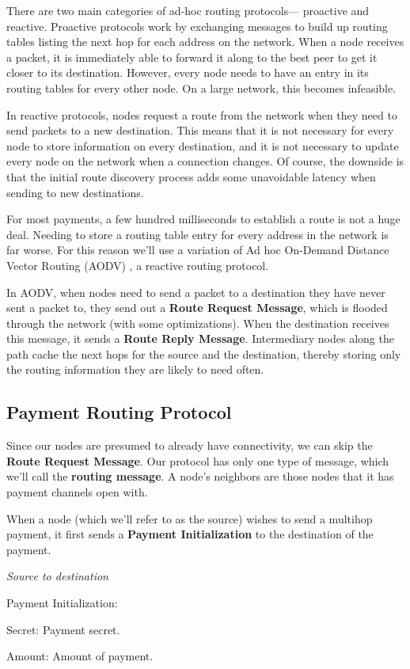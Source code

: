 \documentclass[a4paper]{article}
\newcommand{\bgls}[1]{\textbf{\gls{#1}}}
\newenvironment{mydescription}
{\begin{description}
  \setlength{\itemsep}{5pt}
    \setlength{\parskip}{0pt}
    \setlength{\labelsep}{5pt}
}{
\end{description}}
\begin{document}
There are two main categories of ad-hoc routing protocols--- proactive and reactive. Proactive protocols work by exchanging messages to build up routing tables listing the next hop for each address on the network. When a node receives a packet, it is immediately able to forward it along to the best peer to get it closer to its destination. However, every node needs to have an entry in its routing tables for every other node. On a large network, this becomes infeasible.

In reactive protocols, nodes request a route from the network when they need to send packets to a new destination. This means that it is not necessary for every node to store information on every destination, and it is not necessary to update every node on the network when a connection changes. Of course, the downside is that the initial route discovery process adds some unavoidable latency when sending to new destinations.

For most payments, a few hundred milliseconds to establish a route is not a huge deal. Needing to store a routing table entry for every address in the network is far worse. For this reason we'll use a variation of Ad hoc On-Demand Distance Vector Routing (AODV) \cite{aodv}, a reactive routing protocol.

In AODV, when nodes need to send a packet to a destination they have never sent a packet to, they send out a \textbf{Route Request Message}, which is flooded through the network (with some optimizations). When the destination receives this message, it sends a \textbf{Route Reply Message}. Intermediary nodes along the path cache the next hops for the source and the destination, thereby storing only the routing information they are likely to need often.

\subsection{Payment Routing Protocol}

Since our nodes are presumed to already have connectivity, we can skip the \textbf{Route Request Message}. Our protocol has only one type of message, which we'll call the \bgls{routing message}. A node's neighbors are those nodes that it has payment channels open with.

When a node (which we'll refer to as the source) wishes to send a multihop payment, it first sends a \textbf{Payment Initialization} to the destination of the payment.

\begin{mdframed}[style=message]{\emph{Source to destination}}
\begin{mydescription}
  \item[Payment Initialization:] \hfill
  \begin{mydescription}
    \item[Secret:] Payment secret.
    \item[Amount:] Amount of payment.
  \end{mydescription}
\end{mydescription}
\end{mdframed}
\end{document}

